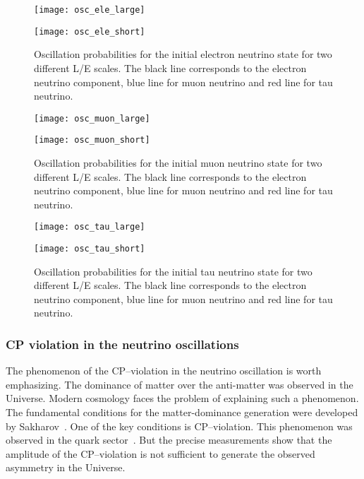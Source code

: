 \documentclass[../main.tex]{subfiles}
\begin{document}
\begin{figure}[!ht]
\centering
\begin{minipage}{0.4\linewidth}
  \centering
  \texttt{[image: osc\_ele\_large]}
\end{minipage}
\hfill
\begin{minipage}{0.4\linewidth}
  \centering
  \texttt{[image: osc\_ele\_short]}
\end{minipage}
\caption{Oscillation probabilities for the initial electron neutrino state for two different L/E scales. The black line corresponds to the electron neutrino component, blue line for muon neutrino and red line for tau neutrino.}
\label{fig:intro:osc1}
\end{figure}

\begin{figure}
\centering
\begin{minipage}{0.4\linewidth}
  \texttt{[image: osc\_muon\_large]}
\end{minipage}
\hfill
\begin{minipage}{0.4\linewidth}
  \texttt{[image: osc\_muon\_short]}
\end{minipage}
\caption{Oscillation probabilities for the initial muon neutrino state for two different L/E scales. The black line corresponds to the electron neutrino component, blue line for muon neutrino and red line for tau neutrino.}
\label{fig:intro:osc2}
\end{figure}

\begin{figure}
\centering
\begin{minipage}{0.4\linewidth}
  \texttt{[image: osc\_tau\_large]}
\end{minipage}
\hfill
\begin{minipage}{0.4\linewidth}
  \texttt{[image: osc\_tau\_short]}
\end{minipage}
\caption{Oscillation probabilities for the initial tau neutrino state for two different L/E scales. The black line corresponds to the electron neutrino component, blue line for muon neutrino and red line for tau neutrino.}
\label{fig:intro:osc3}
\end{figure}

\subsubsection{CP violation in the neutrino oscillations}
\label{sec:intro:cp}
The phenomenon of the CP--violation in the neutrino oscillation is worth emphasizing. The dominance of matter over the anti-matter was observed in the Universe. Modern cosmology faces the problem of explaining such a phenomenon. The fundamental conditions for the matter-dominance generation were developed by Sakharov~\cite{Sakharov1967}. One of the key conditions is CP--violation. This phenomenon was observed in the quark sector~\cite{Tanabashi2018}. But the precise measurements show that the amplitude of the CP--violation is not sufficient to generate the observed asymmetry in the Universe.
\end{document}
